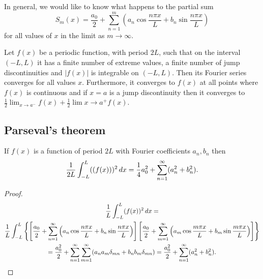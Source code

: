 \documentclass[10pt, a4paper]{article}
\begin{document}
In general,
we would like to know what happens to the partial sum
\[
S_m(x) = \frac{a_0}{2} + \sum_{n = 1}^{m}\left(a_n\cos{\frac{n\pi x}{L}} + b_n\sin{\frac{n\pi x}{L}}\right)
\]
for all values of $x$ in the limit as $m \rightarrow \infty$.

\begin{theorem}
    Let $f(x)$ be a periodic function,
    with period $2L$,
    such that on the interval $(-L, L)$ it has a finite number of extreme values,
    a finite number of jump discontinuities and $|f(x)|$ is integrable on $(-L, L)$.
    Then its Fourier series converges for all values $x$.
    Furthermore,
    it converges to $f(x)$ at all points where $f(x)$ is continuous and if $x = a$ is a jump discontinuity then it converges to $\frac{1}{2}\lim_{x \rightarrow a ^ {-}}f(x) + \frac{1}{2}\lim{x \rightarrow a ^ {+}}f(x)$.
\end{theorem}

\subsection{Parseval’s theorem}

\begin{theorem}
    If $f(x)$ is a function of period $2L$ with Fourier coefficients $a_n, b_n$ then
    \[
    \frac{1}{2L}\int_{-L}^{L}((f(x))) ^ 2\,dx = \frac{1}{4}a_0 ^ 2 + \infsum[n = 1](a_n ^ 2 + b_n ^ 2).
    \]
    \begin{proof}
        \begin{gather*}
            \frac{1}{L}\int_{-L}^{L}(f(x)) ^ 2\,dx = \\
            \frac{1}{L}\int_{-L}^{L}\left\{\left[\frac{a_0}{2} + \infsum[n = 1]\left(a_n\cos{\frac{n\pi x}{L}} + b_n\sin{\frac{n\pi x}{L}}\right)\right]\left[\frac{a_0}{2} + \infsum[m = 1]\left(a_m\cos{\frac{m\pi x}{L}} + b_m\sin{\frac{m\pi x}{L}}\right)\right]\right\} \\
            = \frac{a_0 ^ 2}{2} + \infsum[n = 1]\infsum[m = 1](a_na_m\delta_{mn} + b_nb_m\delta_{mn}) = \frac{a_0 ^ 2}{2} + \infsum[n = 1](a_n ^ 2 + b_n ^ 2).
        \end{gather*}
    \end{proof}
\end{theorem}
\end{document}
